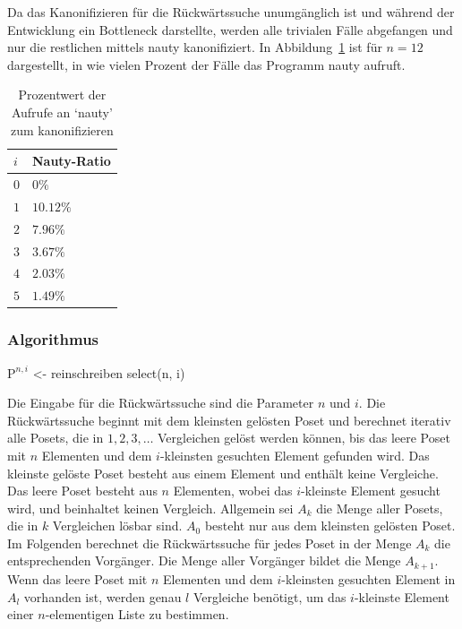 \documentclass[10pt,journal,compsoc]{IEEEtran}
\begin{document}
Da das Kanonifizieren für die Rückwärtssuche unumgänglich ist und während der Entwicklung ein Bottleneck darstellte, werden alle trivialen Fälle abgefangen und nur die restlichen mittels nauty kanonifiziert.
In Abbildung~\ref{table:nauty-ratio} ist für $n = 12$ dargestellt, in wie vielen Prozent der Fälle das Programm nauty aufruft.

\begin{table}
  \begin{tabular}{l|l}
    $i$ & Nauty-Ratio \\ %
    \hline
    $0$ & $0\%$       \\
    $1$ & $10.12\%$   \\
    $2$ & $7.96\%$    \\
    $3$ & $3.67\%$    \\
    $4$ & $2.03\%$    \\
    $5$ & $1.49\%$
  \end{tabular}
  \centering
  \caption{Prozentwert der Aufrufe an `nauty' zum kanonifizieren}
  \label{table:nauty-ratio}
\end{table}

\subsubsection{Algorithmus} \label{sec:backward:algorithm}

$\text{P}^{n, i}$ <- reinschreiben
select(n, i)

Die Eingabe für die Rückwärtssuche sind die Parameter $n$ und $i$.
Die Rückwärtssuche beginnt mit dem kleinsten gelösten Poset und berechnet iterativ alle Posets, die in $1, 2, 3, \dots$ Vergleichen gelöst werden können, bis das leere Poset mit $n$ Elementen und dem $i$-kleinsten gesuchten Element gefunden wird.
Das kleinste gelöste Poset besteht aus einem Element und enthält keine Vergleiche.
Das leere Poset besteht aus $n$ Elementen, wobei das $i$-kleinste Element gesucht wird, und beinhaltet keinen Vergleich.
Allgemein sei $A_k$ die Menge aller Posets, die in $k$ Vergleichen lösbar sind.
$A_0$ besteht nur aus dem kleinsten gelösten Poset.
Im Folgenden berechnet die Rückwärtssuche für jedes Poset in der Menge $A_k$ die entsprechenden Vorgänger.
Die Menge aller Vorgänger bildet die Menge $A_{k + 1}$.
Wenn das leere Poset mit $n$ Elementen und dem $i$-kleinsten gesuchten Element in $A_l$ vorhanden ist, werden genau $l$ Vergleiche benötigt, um das $i$-kleinste Element einer $n$-elementigen Liste zu bestimmen.
\end{document}

